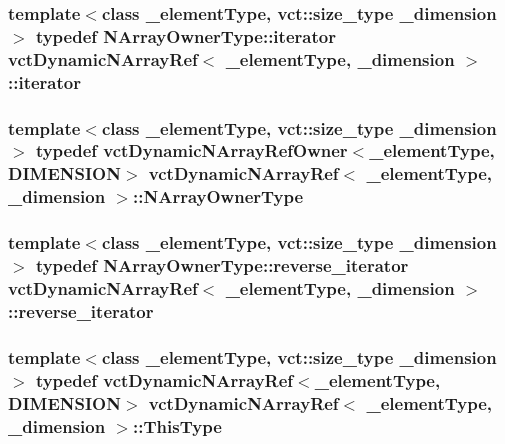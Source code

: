\hypertarget{classvct_dynamic_n_array_ref_a790307f3b784640fd845e3a7f548374f}{
\subsubsection[{iterator}]{\setlength{\rightskip}{0pt plus 5cm}template$<$class \-\_\-element\-Type, vct\-::size\-\_\-type \-\_\-dimension$>$ typedef {\bf N\-Array\-Owner\-Type\-::iterator} {\bf vct\-Dynamic\-N\-Array\-Ref}$<$ \-\_\-element\-Type, \-\_\-dimension $>$\-::{\bf iterator}}}\label{classvct_dynamic_n_array_ref_a790307f3b784640fd845e3a7f548374f}
\hypertarget{classvct_dynamic_n_array_ref_a64f8693e4cbab79b5b73e1e3a8620dca}{
\subsubsection[{N\-Array\-Owner\-Type}]{\setlength{\rightskip}{0pt plus 5cm}template$<$class \-\_\-element\-Type, vct\-::size\-\_\-type \-\_\-dimension$>$ typedef {\bf vct\-Dynamic\-N\-Array\-Ref\-Owner}$<$\-\_\-element\-Type, {\bf D\-I\-M\-E\-N\-S\-I\-O\-N}$>$ {\bf vct\-Dynamic\-N\-Array\-Ref}$<$ \-\_\-element\-Type, \-\_\-dimension $>$\-::{\bf N\-Array\-Owner\-Type}}}\label{classvct_dynamic_n_array_ref_a64f8693e4cbab79b5b73e1e3a8620dca}
\hypertarget{classvct_dynamic_n_array_ref_a94a5409f7d94313da64fc744ddd2b484}{
\subsubsection[{reverse\-\_\-iterator}]{\setlength{\rightskip}{0pt plus 5cm}template$<$class \-\_\-element\-Type, vct\-::size\-\_\-type \-\_\-dimension$>$ typedef {\bf N\-Array\-Owner\-Type\-::reverse\-\_\-iterator} {\bf vct\-Dynamic\-N\-Array\-Ref}$<$ \-\_\-element\-Type, \-\_\-dimension $>$\-::{\bf reverse\-\_\-iterator}}}\label{classvct_dynamic_n_array_ref_a94a5409f7d94313da64fc744ddd2b484}
\hypertarget{classvct_dynamic_n_array_ref_a157266ffe0ad737f4df13dcf499a4494}{
\subsubsection[{This\-Type}]{\setlength{\rightskip}{0pt plus 5cm}template$<$class \-\_\-element\-Type, vct\-::size\-\_\-type \-\_\-dimension$>$ typedef {\bf vct\-Dynamic\-N\-Array\-Ref}$<$\-\_\-element\-Type, {\bf D\-I\-M\-E\-N\-S\-I\-O\-N}$>$ {\bf vct\-Dynamic\-N\-Array\-Ref}$<$ \-\_\-element\-Type, \-\_\-dimension $>$\-::{\bf This\-Type}}}\label{classvct_dynamic_n_array_ref_a157266ffe0ad737f4df13dcf499a4494}


